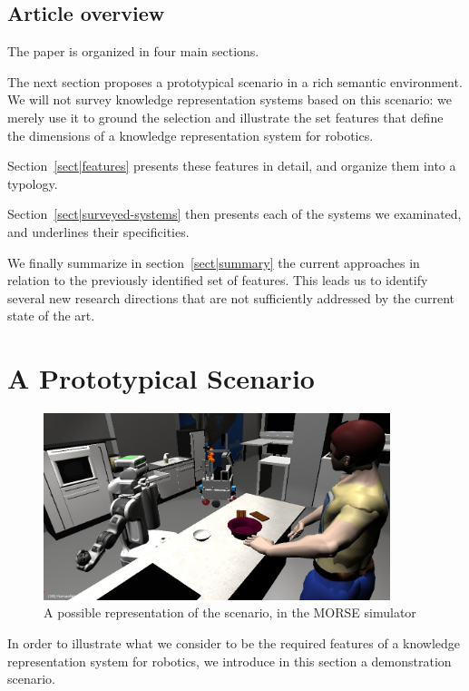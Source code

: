 \documentclass[a4paper, twocolumn]{article}
\begin{document}
\subsection{Article overview}
\label{sect|overview}

The paper is organized in four main sections.

The next section proposes a prototypical scenario in a rich semantic
environment. We will not survey knowledge representation systems based on this
scenario: we merely use it to ground the selection and illustrate the set
features that define the dimensions of a
knowledge representation system for robotics.

Section~\ref{sect|features} presents these features in detail, and organize
them into a typology.

Section~\ref{sect|surveyed-systems} then presents each of the systems we
examinated, and underlines their specificities.

We finally summarize in section~\ref{sect|summary} the current approaches in
relation to the previously identified set of features. This leads us to
identify several new research directions that are not sufficiently addressed by
the current state of the art.

\section{A Prototypical Scenario}
\label{sect|scenario}

\begin{figure}
	\centering
	\includegraphics[width=0.9\textwidth]{figs/brownie_scenario.jpg}
	\caption{A possible representation of the scenario, in the MORSE simulator}
	\label{fig|scenario}
\end{figure}

In order to illustrate what we consider to be the required features of a
knowledge representation system for robotics, we introduce in this section a
demonstration scenario.
\end{document}
